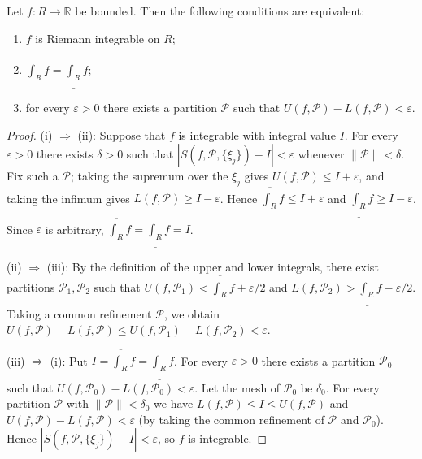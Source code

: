 \begin{theorem}\label{thm:riemann_integrable_criterion}
Let $f: R \to \mathbb{R}$ be bounded. Then the following conditions are equivalent:
\begin{enumerate}[label=(\roman*)]
    \item $f$ is Riemann integrable on $R$;
    \item $\overline{\int_R} f = \underline{\int_R} f$;
    \item for every $\varepsilon > 0$ there exists a partition $\mathcal{P}$ such that $U(f, \mathcal{P}) - L(f, \mathcal{P}) < \varepsilon$.
\end{enumerate}
\end{theorem}

\begin{proof}
(i) $\Rightarrow$ (ii): Suppose that $f$ is integrable with integral value $I$. For every $\varepsilon > 0$ there exists $\delta > 0$ such that $|S(f, \mathcal{P}, \{\xi_j\}) - I| < \varepsilon$ whenever $\|\mathcal{P}\| < \delta$. Fix such a $\mathcal{P}$; taking the supremum over the $\xi_j$ gives $U(f, \mathcal{P}) \le I + \varepsilon$, and taking the infimum gives $L(f, \mathcal{P}) \ge I - \varepsilon$. Hence $\overline{\int_R} f \le I + \varepsilon$ and $\underline{\int_R} f \ge I - \varepsilon$. Since $\varepsilon$ is arbitrary, $\overline{\int_R} f = \underline{\int_R} f = I$.

(ii) $\Rightarrow$ (iii): By the definition of the upper and lower integrals, there exist partitions $\mathcal{P}_1, \mathcal{P}_2$ such that $U(f, \mathcal{P}_1) < \overline{\int_R} f + \varepsilon/2$ and $L(f, \mathcal{P}_2) > \underline{\int_R} f - \varepsilon/2$. Taking a common refinement $\mathcal{P}$, we obtain $U(f, \mathcal{P}) - L(f, \mathcal{P}) \le U(f, \mathcal{P}_1) - L(f, \mathcal{P}_2) < \varepsilon$.

(iii) $\Rightarrow$ (i): Put $I = \overline{\int_R} f = \underline{\int_R} f$. For every $\varepsilon > 0$ there exists a partition $\mathcal{P}_0$ such that $U(f, \mathcal{P}_0) - L(f, \mathcal{P}_0) < \varepsilon$. Let the mesh of $\mathcal{P}_0$ be $\delta_0$. For every partition $\mathcal{P}$ with $\|\mathcal{P}\| < \delta_0$ we have $L(f, \mathcal{P}) \le I \le U(f, \mathcal{P})$ and $U(f, \mathcal{P}) - L(f, \mathcal{P}) < \varepsilon$ (by taking the common refinement of $\mathcal{P}$ and $\mathcal{P}_0$). Hence $|S(f, \mathcal{P}, \{\xi_j\}) - I| < \varepsilon$, so $f$ is integrable.
\end{proof}

